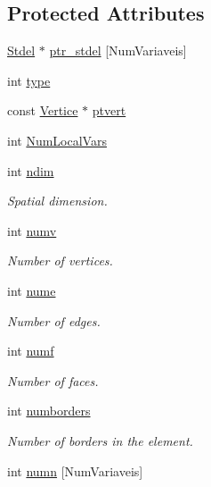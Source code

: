 \subsection*{Protected Attributes}
\begin{DoxyCompactItemize}
\item 
\hyperlink{classStdel}{Stdel} $\ast$ \hyperlink{classPhElem_a7b4509b90bcf92be76cd8fdb76d7385b}{ptr\+\_\+stdel} \mbox{[}Num\+Variaveis\mbox{]}
\item 
int \hyperlink{classPhElem_a1ed1b45136a718afef64c846fb905546}{type}
\item 
const \hyperlink{structVertice}{Vertice} $\ast$ \hyperlink{classPhElem_a92acc9f8f36991ce851df5e462425d3c}{ptvert}
\item 
int \hyperlink{classPhElem_a2ec71d768628a94d7fbe74be08a08ea9}{Num\+Local\+Vars}
\item 
int \hyperlink{classPhElem_af3ea3f4193f7d65855c3fabead6f2545}{ndim}
\begin{DoxyCompactList}\small\item\em Spatial dimension. \end{DoxyCompactList}\item 
int \hyperlink{classPhElem_a67ed36925b04bf0f2d177c8d31737526}{numv}
\begin{DoxyCompactList}\small\item\em Number of vertices. \end{DoxyCompactList}\item 
int \hyperlink{classPhElem_a1c0c7833feba84d4ed83d172244ca3e1}{nume}
\begin{DoxyCompactList}\small\item\em Number of edges. \end{DoxyCompactList}\item 
int \hyperlink{classPhElem_a85d9a8342adf9e155a533edf165a6fe3}{numf}
\begin{DoxyCompactList}\small\item\em Number of faces. \end{DoxyCompactList}\item 
int \hyperlink{classPhElem_ad24d6fbe02539875405dd4a6cf094284}{numborders}
\begin{DoxyCompactList}\small\item\em Number of borders in the element. \end{DoxyCompactList}\item 
int \hyperlink{classPhElem_a8e65fa4998d28b9b8db9b6fcf8999d20}{numn} \mbox{[}Num\+Variaveis\mbox{]}
\item 

\end{DoxyCompactItemize}
